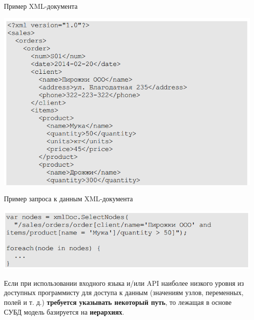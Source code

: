 \documentclass{beamer}
\begin{document}
\begin{frame}
\begin{block}{Пример XML-документа}
\begin{center}
\includegraphics[scale=0.5]{images/example-04.png}
\end{center}
\end{block}
\end{frame}

\begin{frame}
\begin{block}{Пример запроса к данным XML-документа}
\begin{center}
\includegraphics[scale=0.5]{images/example-05.png}
\end{center}
\end{block}

Если при использовании входного языка и/или API наиболее низкого уровня из доступных программисту для доступа к данным (значениям узлов, переменных, полей и т. д.) \textbf{требуется указывать некоторый путь}, то лежащая в основе СУБД модель базируется на \textbf{иерархиях}.
\end{frame}
\end{document}
